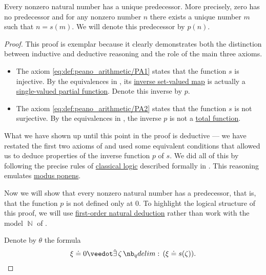 \begin{proposition}\label{thm:nonzero_natural_numbers_have_predecessors}
  Every nonzero natural number has a unique predecessor. More precisely, zero has no predecessor and for any nonzero number \( n \) there exists a unique number \( m \) such that \( n = s(m) \). We will denote this predecessor by \( p(n) \).
\end{proposition}
\begin{proof}
  This proof is exemplar because it clearly demonstrates both the distinction between inductive and deductive reasoning and the role of the main three axioms.

  \begin{itemize}
    \item The axiom \eqref{eq:def:peano_arithmetic/PA1} states that the function \( s \) is injective. By the equivalences in , its \hyperref[def:set_valued_map/inverse]{inverse set-valued map} is actually a \hyperref[def:set_valued_map/partial]{single-valued partial function}. Denote this inverse by \( p \).

    \item The axiom \eqref{eq:def:peano_arithmetic/PA2} states that the function \( s \) is not surjective. By the equivalences in , the inverse \( p \) is not a \hyperref[def:set_valued_map/partial]{total function}.
  \end{itemize}

  What we have shown up until this point in the proof is deductive --- we have restated the first two axioms of  and used some equivalent conditions that allowed us to deduce properties of the inverse function \( p \) of \( s \). We did all of this by following the precise rules of \hyperref[con:classical_logic]{classical logic} described formally in . This reasoning emulates \hyperref[eq:def:def:axiomatic_deductive_system/mp]{modus ponens}.

  Now we will show that every nonzero natural number has a predecessor, that is, that the function \( p \) is not defined only at \( 0 \). To highlight the logical structure of this proof, we will use \hyperref[def:first_order_natural_deduction_system]{first-order natural deduction} rather than work with the model \( \BbbN \) of .

  Denote by \( \theta \) the formula
  \begin{equation*}
    \xi \syneq 0 \synvee \qexists \zeta (\xi \syneq s(\zeta)).
  \end{equation*}


\end{proof}

